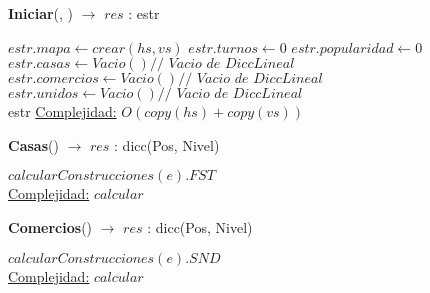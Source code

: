 \begin{Algoritmos}

\begin{algorithm}[H]{\textbf{Iniciar}(, ) $\to$ $res$ : estr}
\begin{algorithmic}[1]
    \State $estr.mapa \gets crear(hs, vs)$
    \State $estr.turnos \gets 0$
    \State $estr.popularidad \gets 0$
    \State $estr.casas \gets Vacio() \textit{// Vacio de DiccLineal}$
    \State $estr.comercios \gets Vacio() \textit{// Vacio de DiccLineal}$
    \State $estr.unidos \gets Vacio() \textit{// Vacio de DiccLineal}$\\
    \Return estr
    \medskip
    \Statex \underline{Complejidad:} $O(copy(hs) + copy(vs))$
\end{algorithmic}
\end{algorithm}

\begin{algorithm}[H]{\textbf{Casas}() $\to$ $res$ : dicc(Pos, Nivel)} %
\begin{algorithmic}[1]
    \Return $calcularConstrucciones(e).FST$ \\
    \medskip
    \Statex \underline{Complejidad:} $calcular$
\end{algorithmic}
\end{algorithm}

\begin{algorithm}[H]{\textbf{Comercios}() $\to$ $res$ : dicc(Pos, Nivel)} %
\begin{algorithmic}[1]
    \Return $calcularConstrucciones(e).SND$ \\
    \medskip
    \Statex \underline{Complejidad:} $calcular$
\end{algorithmic}
\end{algorithm}


\end{Algoritmos}
